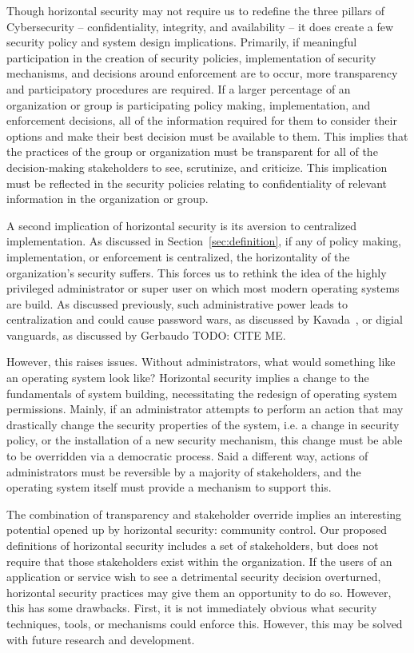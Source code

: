 Though horizontal security may not require us to redefine the three pillars of
Cybersecurity -- confidentiality, integrity, and availability -- it does create
a few security policy and system design implications. Primarily, if meaningful
participation in the creation of security policies, implementation of security
mechanisms, and decisions around enforcement are to occur, more transparency and
participatory procedures are required. If a larger percentage of an organization
or group is participating policy making, implementation, and enforcement 
decisions, all of the information required for them to consider their options
and make their best decision must be available to them. This implies that the
practices of the group or organization must be transparent for all of the
decision-making stakeholders to see, scrutinize, and criticize. This implication
must be reflected in the security policies relating to confidentiality of
relevant information in the organization or group.

A second implication of horizontal security is its aversion to centralized
implementation. As discussed in Section~\ref{sec:definition}, if any of policy
making, implementation, or enforcement is centralized, the horizontality of the
organization's security suffers. This forces us to rethink the idea of the
highly privileged administrator or super user on which most modern operating
systems are build. As discussed previously, such administrative power leads to
centralization and could cause password wars, as discussed by 
Kavada~\cite{kavada2020counterpublics}, or digial vanguards, as discussed by 
Gerbaudo {\color{red} TODO: CITE ME}.

However, this raises issues. Without administrators, what would something like
an operating system look like? Horizontal security implies a change to the 
fundamentals of system building, necessitating the redesign of operating system
permissions. Mainly, if an administrator attempts to perform an action that may
drastically change the security properties of the system, i.e. a change in
security policy, or the installation of a new security mechanism, this change
must be able to be overridden via a democratic process. Said a different way,
actions of administrators must be reversible by a majority of stakeholders, and
the operating system itself must provide a mechanism to support this.

The combination of transparency and stakeholder override implies an interesting
potential opened up by horizontal security: community control. Our proposed
definitions of horizontal security includes a set of stakeholders, but does not
require that those stakeholders exist within the organization. If the users of
an application or service wish to see a detrimental security decision
overturned, horizontal security practices may give them an opportunity to do so.
However, this has some drawbacks. First, it is not immediately obvious what
security techniques, tools, or mechanisms could enforce this. However, this may
be solved with future research and development.

